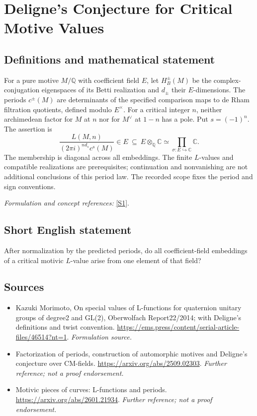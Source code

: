 \documentclass[11pt]{article}
\begin{document}
\section*{\texorpdfstring{Deligne's Conjecture for Critical Motive Values}{Deligne's Conjecture for Critical Motive Values}}\label{statement}
\subsection{Definitions and mathematical statement}
For a pure motive $M/{\mathbb{Q}}$ with coefficient field $E$, let $H_B^\pm(M)$ be the complex-conjugation eigenspaces of its Betti realization and $d_\pm$ their $E$-dimensions. The periods $c^\pm(M)$ are determinants of the specified comparison maps to de Rham filtration quotients, defined modulo $E^\times$. For a critical integer $n$, neither archimedean factor for $M$ at $n$ nor for $M^\vee$ at $1-n$ has a pole. Put $s=(-1)^n$. The assertion is
\[
 \frac{L(M,n)}{(2\pi i)^{n d_s}c^s(M)}\in E
 \ \subseteq\ E\otimes_{{\mathbb{Q}}}{\mathbb{C}}\simeq\prod_{\sigma:E\hookrightarrow{\mathbb{C}}}{\mathbb{C}}.
\]
The membership is diagonal across all embeddings. The finite $L$-values and compatible realizations are prerequisites; continuation and nonvanishing are not additional conclusions of this period law. The recorded scope fixes the period and sign conventions.
\par\smallskip\textit{Formulation and concept references:} \href{https://ems.press/content/serial-article-files/46514?nt=1}{[S1]}.

\subsection{Short English statement}
After normalization by the predicted periods, do all coefficient-field embeddings of a critical motivic $L$-value arise from one element of that field?
\subsection{Sources}
\begin{itemize}
\item[S1]Kazuki Morimoto, On special values of L-functions for quaternion unitary groups of degree2 and GL(2), Oberwolfach Report22/2014; with Deligne's definitions and twist convention.
\url{https://ems.press/content/serial-article-files/46514?nt=1}.
\textit{Formulation source.}
\item[S2]Factorization of periods, construction of automorphic motives and Deligne's conjecture over CM-fields.
\url{https://arxiv.org/abs/2509.02303}.
\textit{Further reference; not a proof endorsement.}
\item[S3]Motivic pieces of curves: L-functions and periods.
\url{https://arxiv.org/abs/2601.21934}.
\textit{Further reference; not a proof endorsement.}
\end{itemize}
\end{document}
